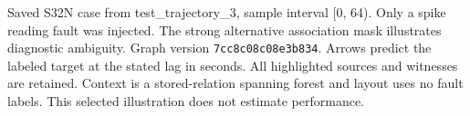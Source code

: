 Saved S32N case from test\_trajectory\_3, sample interval [0, 64). Only a spike reading fault was injected. The strong alternative association mask illustrates diagnostic ambiguity. Graph version \texttt{7cc8c08c08e3b834}. Arrows predict the labeled target at the stated lag in seconds. All highlighted sources and witnesses are retained. Context is a stored-relation spanning forest and layout uses no fault labels. This selected illustration does not estimate performance.
